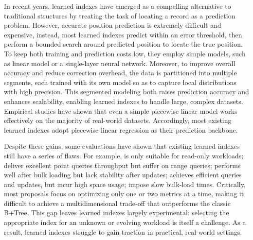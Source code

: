 In recent years, learned indexes have emerged as a compelling alternative to traditional structures by treating the task of locating a record as a prediction problem. However, accurate position prediction is extremely difficult and expensive, instead, most learned indexes predict within an error threshold, then perform a bounded search around predicted position to locate the true position. To keep both training and prediction costs low, they employ simple models, such as linear model or a single-layer neural network. Moreover, to improve overall accuracy and reduce correction overhead, the data is partitioned into multiple segments, each trained with its own model so as to capture local distributions with high precision. This segmented modeling both raises prediction accuracy and enhances scalability, enabling learned indexes to handle large, complex datasets. Empirical studies \cite{sosd20} have shown that even a simple piecewise linear model works effectively on the majority of real-world datasets. Accordingly, most existing learned indexes \cite{pgm20, radixspline20, fiting-tree19, alex20, madex20, coax23, swix24, disklearned24} adopt piecewise linear regression as their prediction backbone.

Despite these gains, some evaluations \cite{sosd20, micro22, gre22, learned23} have shown that existing learned indexes still have a series of flaws. For example, \cite{case18, plex21, towards21} is only suitable for read-only workloads; \cite{xindex20, lipp21, finedex21, chameleon24} deliver excellent point queries throughput but suffer on range queries; \cite{pgm20} performs well after bulk loading but lack stability after updates; \cite{lipp21} achieves efficient queries and updates, but incur high space usage; \cite{alex20, swix24} impose slow bulk‐load times. Critically, most proposals focus on optimizing only one or two metrics at a time, making it difficult to achieve a multidimensional trade‑off that outperforms the classic B+Tree. This gap leaves learned indexes largely experimental: selecting the appropriate index for an unknown or evolving workload is itself a challenge. As a result, learned indexes struggle to gain traction in practical, real‑world settings.

